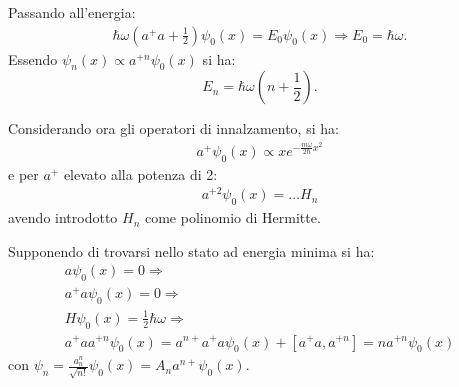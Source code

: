 Passando all'energia:
\begin{equation}\begin{split}
\hbar \omega\left(a^+a+\frac{1}{2}\right)\psi_0\left(x\right)=E_0\psi_0\left(x\right) \Longrightarrow E_0=\hbar \omega.
\end{split}\end{equation}
Essendo $\psi_n\left(x\right)\propto a^{+n}\psi_0\left(x\right)$ si ha:
\begin{equation}
E_n=\hbar \omega \left(n+\frac{1}{2}\right).
\end{equation}

Considerando ora gli operatori di innalzamento, si ha:
\begin{equation}\begin{split}
a^+\psi _0\left(x\right) \propto xe^{-\frac{m\omega }{2\hbar }x^2}
\end{split}\end{equation}
e per $a^+$ elevato alla potenza di 2:
\begin{equation}\begin{split}
a^{+2}\psi _0\left(x\right)=\dots H_n
\end{split}\end{equation}
avendo introdotto $H_n$ come polinomio di Hermitte.

Supponendo di trovarsi nello stato ad energia minima si ha:
\begin{equation}\begin{split}
a\psi _0\left(x\right)=0 \Longrightarrow \\
a^+a\psi _0\left(x\right)=0 \Longrightarrow \\
H\psi _0\left(x\right)=\frac{1}{2}\hbar \omega \Longrightarrow \\
a^+aa^{+n}\psi _0\left(x\right)=a^{n+}a^+a\psi _0\left(x\right)+\left[a^+a,a^{+n}\right]=na^{+n}\psi _0\left(x\right)
\end{split}\end{equation}
con $\psi _n=\frac{a_n^n}{\sqrt{n!}}\psi _0(x)=A_na^{n+}\psi _0(x)$.


